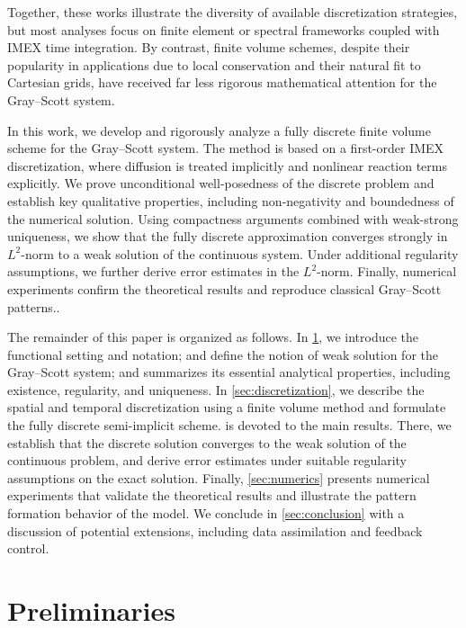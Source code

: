 \documentclass[11pt, a4paper]{amsart}
\numberwithin{equation}{section}
\begin{document}
	Together, these works illustrate the diversity of available discretization strategies, but most analyses focus on finite element or spectral frameworks coupled with IMEX time integration. By contrast, finite volume schemes, despite their popularity in applications due to local conservation and their natural fit to Cartesian grids, have received far less rigorous mathematical attention for the Gray--Scott system.
	
	In this work, we develop and rigorously analyze a fully discrete finite volume scheme for the Gray--Scott system. The method is based on a first-order IMEX discretization, where diffusion is treated implicitly and nonlinear reaction terms explicitly. We prove unconditional well-posedness of the discrete problem and establish key qualitative properties, including non-negativity and boundedness of the numerical solution. Using compactness arguments combined with weak-strong uniqueness, we show that the fully discrete approximation converges strongly in $L^2$-norm to a weak solution of the continuous system. Under additional regularity assumptions, we further derive error estimates in the $L^2$-norm. Finally, numerical experiments confirm the theoretical results and reproduce classical Gray--Scott patterns..
	
	The remainder of this paper is organized as follows. In \cref{sec:prelim}, we introduce the functional setting and notation; and define the notion of weak solution for the Gray--Scott system; and summarizes its essential analytical properties, including existence, regularity, and uniqueness. In \cref{sec:discretization}, we describe the spatial and temporal discretization using a finite volume method and formulate the fully discrete semi-implicit scheme.  is devoted to the main results. There, we establish that the discrete solution converges to the weak solution of the continuous problem, and derive error estimates under suitable regularity assumptions on the exact solution. Finally, \cref{sec:numerics} presents numerical experiments that validate the theoretical results and illustrate the pattern formation behavior of the model. We conclude in \cref{sec:conclusion} with a discussion of potential extensions, including data assimilation and feedback control.
	
	
	\section{Preliminaries}\label{sec:prelim}
	
\end{document}
